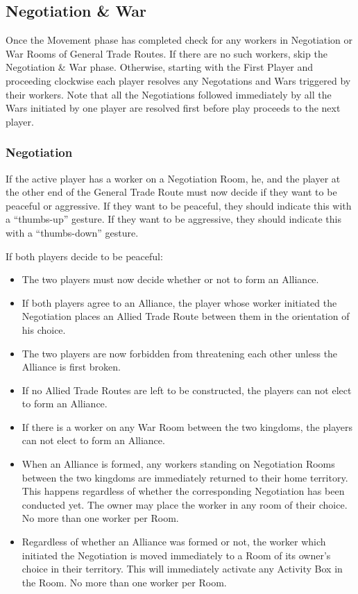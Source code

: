 \documentclass[10pt,twocolumn]{article}
\begin{document}
\subsection{Negotiation \& War}
Once the Movement phase has completed check for any workers in Negotiation or War Rooms of General Trade Routes. If there are no such workers, skip the Negotiation \& War phase. Otherwise, starting with the First Player and proceeding clockwise each player resolves any Negotations and Wars triggered by their workers. Note that all the Negotiations followed immediately by all the Wars initiated by one player are resolved first before play proceeds to the next player. 

\subsubsection{Negotiation}
If the active player has a worker on a Negotiation Room, he, and the player at the other end of the General Trade Route must now decide if they want to be peaceful or aggressive. If they want to be peaceful, they should indicate this with a ``thumbs-up'' gesture. If they want to be aggressive, they should indicate this with a ``thumbs-down'' gesture.

{\noindent If both players decide to be peaceful:}
\begin{itemize}
\item The two players must now decide whether or not to form an Alliance.
\item If both players agree to an Alliance, the player whose worker initiated the Negotiation places an Allied Trade Route between them in the orientation of his choice.
\item The two players are now forbidden from threatening each other unless the Alliance is first broken.
\item If no Allied Trade Routes are left to be constructed, the players can not elect to form an Alliance.
\item If there is a worker on any War Room between the two kingdoms, the players can not elect to form an Alliance.
\item When an Alliance is formed, any workers standing on Negotiation Rooms between the two kingdoms are immediately returned to their home territory. This happens regardless of whether the corresponding Negotiation has been conducted yet. The owner may place the worker in any room of their choice. No more than one worker per Room. 
\item Regardless of whether an Alliance was formed or not, the worker which initiated the Negotiation is moved immediately to a Room of its owner's choice in their territory. This will immediately activate any Activity Box in the Room. No more than one worker per Room.
\end{itemize}
\end{document}
